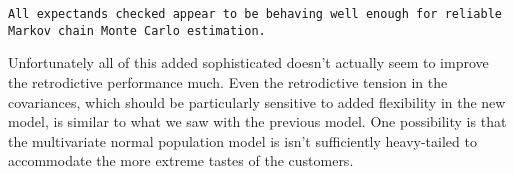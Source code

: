 \documentclass[
  letterpaper,
  DIV=11,
  numbers=noendperiod]{scrartcl}
\newenvironment{Shaded}{\begin{snugshade}}{\end{snugshade}}
\newcommand{\AttributeTok}[1]{\textcolor[rgb]{0.40,0.45,0.13}{#1}}
\newcommand{\ConstantTok}[1]{\textcolor[rgb]{0.56,0.35,0.01}{#1}}
\newcommand{\FunctionTok}[1]{\textcolor[rgb]{0.28,0.35,0.67}{#1}}
\newcommand{\NormalTok}[1]{\textcolor[rgb]{0.00,0.23,0.31}{#1}}
\newcommand{\OtherTok}[1]{\textcolor[rgb]{0.00,0.23,0.31}{#1}}
\newcommand{\SpecialCharTok}[1]{\textcolor[rgb]{0.37,0.37,0.37}{#1}}
\newcommand{\StringTok}[1]{\textcolor[rgb]{0.13,0.47,0.30}{#1}}
\begin{document}
\begin{Shaded}
\end{Shaded}

\begin{verbatim}
All expectands checked appear to be behaving well enough for reliable
Markov chain Monte Carlo estimation.
\end{verbatim}

Unfortunately all of this added sophisticated doesn't actually seem to
improve the retrodictive performance much. Even the retrodictive tension
in the covariances, which should be particularly sensitive to added
flexibility in the new model, is similar to what we saw with the
previous model. One possibility is that the multivariate normal
population model is isn't sufficiently heavy-tailed to accommodate the
more extreme tastes of the customers.
\end{document}
